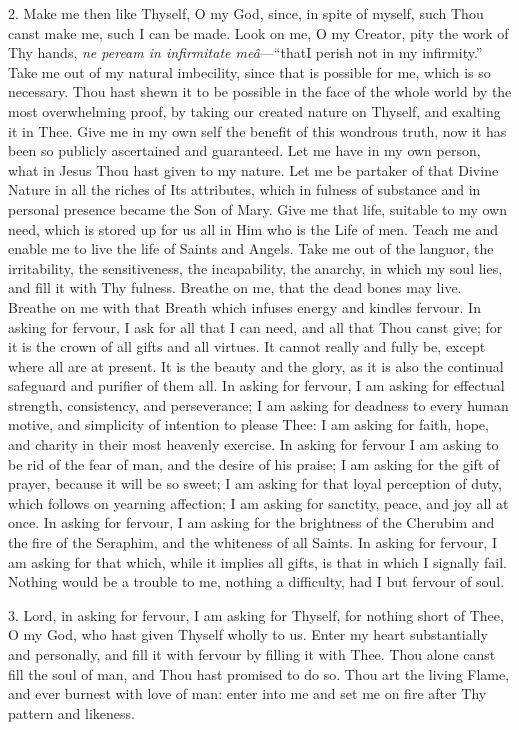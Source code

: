 2. Make me then like Thyself, O
my God, since, in spite of myself, such Thou canst make me, such I can
be made. Look on me, O my Creator, pity the work of Thy hands, \emph{ne
peream in infirmitate meâ}—``that\emph{}I perish not in my
infirmity.'' Take me out of my natural imbecility, since that is possible
for me, which is so necessary. Thou hast shewn it to be possible in the
face of the whole world by the most overwhelming proof, by taking our
created nature on Thyself, and exalting it in Thee. Give me in my own
self the benefit of this wondrous truth, now it has been so publicly
ascertained and guaranteed. Let me have in my own person, what in Jesus
Thou hast given to my nature. Let me be partaker of that Divine Nature
in all the riches of Its attributes, which in fulness of substance and
in personal presence became the Son of Mary. Give me that life, suitable
to my own need, which is stored up for us all in Him who is the Life of
men. Teach me and enable me to live the life of Saints and Angels. Take
me out of the languor, the irritability, the sensitiveness, the
incapability, the anarchy, in which my soul lies, and fill it with Thy
fulness. Breathe on me, that the dead bones may live. Breathe on me with
that Breath which infuses energy and kindles fervour. In asking for
fervour, I ask for all that I can need, and all that Thou canst give;
for it is the crown of all gifts and all virtues. It cannot really and
fully be, except where all are at present. It is the beauty and
the glory, as it is also the continual safeguard and purifier of them
all. In asking for fervour, I am asking for effectual strength,
consistency, and perseverance; I am asking for deadness to every human
motive, and simplicity of intention to please Thee: I am asking for
faith, hope, and charity in their most heavenly exercise. In asking for
fervour I am asking to be rid of the fear of man, and the desire of his
praise; I am asking for the gift of prayer, because it will be so sweet;
I am asking for that loyal perception of duty, which follows on yearning
affection; I am asking for sanctity, peace, and joy all at once. In
asking for fervour, I am asking for the brightness of the Cherubim and
the fire of the Seraphim, and the whiteness of all Saints. In asking for
fervour, I am asking for that which, while it implies all gifts, is that
in which I signally fail. Nothing would be a trouble to me, nothing a
difficulty, had I but fervour of soul.

3. Lord, in asking for fervour,
I am asking for Thyself, for nothing short of Thee, O my God, who hast
given Thyself wholly to us. Enter my heart substantially and personally,
and fill it with fervour by filling it with Thee. Thou alone canst fill
the soul of man, and Thou hast promised to do so. Thou art the living
Flame, and ever burnest with love of man: enter into me and set me on
fire after Thy pattern and likeness.

